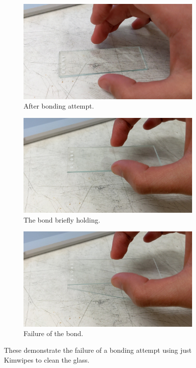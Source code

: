 \documentclass[colorlinks=true,pdfstartview=FitV,linkcolor=blue,
            citecolor=red,urlcolor=magenta]{ligodoc}
\begin{document}
\begin{figure}
\begin{center}
\begin{subfigure}
  \centering
  \includegraphics[width=4in]{graphics/kimwipe_before_PXL_20220712_003150428_exported_33.jpg}
  \caption{After bonding attempt.}
  \label{fig:kimwipe_bond_sfig1}
\end{subfigure}
\begin{subfigure}
  \centering
  \includegraphics[width=4in]{graphics/kimwipe_during_PXL_20220712_003150428_exported_3069.jpg}
  \caption{The bond briefly holding.}
  \label{fig:kimwipe_bond_sfig2}
\end{subfigure}
\begin{subfigure}
  \centering
  \includegraphics[width=4in]{graphics/kimwipe_after_PXL_20220712_003150428_exported_3069.jpg}
  \caption{Failure of the bond.}
  \label{fig:kimwipe_bond_sfig3}
\end{subfigure}
\caption{These demonstrate the failure of a bonding attempt using just Kimwipes to clean the glass.}
\label{fig:kimwipe_bond}
\end{center}
\end{figure}
\end{document}
